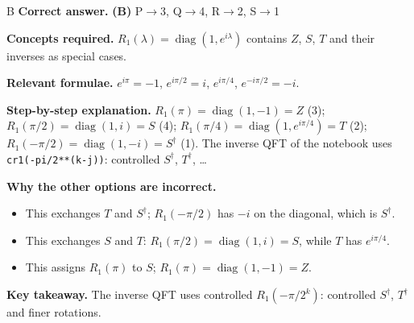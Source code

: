 \documentclass[11pt,a4paper]{article}
\newcommand{\qsep}{\par\vspace{2pt}{\color{black!15}\hrule}\vspace{4pt}}
\begin{document}
\begin{solbox}{B}
\textbf{\color{brand}Correct answer.} \textcolor{okgreen}{\textbf{(B)}} P$\to$3, Q$\to$4, R$\to$2, S$\to$1

\textbf{\color{brand}Concepts required.} $R_1(\lambda) = \operatorname{diag}(1, e^{i\lambda})$ contains $Z$, $S$, $T$ and their inverses as special cases.

\textbf{\color{brand}Relevant formulae.} $e^{i\pi} = -1$, $e^{i\pi/2} = i$, $e^{i\pi/4}$, $e^{-i\pi/2} = -i$.

\textbf{\color{brand}Step-by-step explanation.} $R_1(\pi) = \operatorname{diag}(1, -1) = Z$ (3); $R_1(\pi/2) = \operatorname{diag}(1, i) = S$ (4); $R_1(\pi/4) = \operatorname{diag}(1, e^{i\pi/4}) = T$ (2);
$R_1(-\pi/2) = \operatorname{diag}(1, -i) = S^\dagger$ (1). The inverse QFT of the notebook uses \texttt{cr1(-pi/2**(k-j))}: controlled $S^\dagger$, $T^\dagger$, \dots

\textbf{\color{brand}Why the other options are incorrect.}
\begin{itemize}[leftmargin=2.4em, itemsep=1pt, topsep=2pt]
\item[\textbf{(A)}] This exchanges $T$ and $S^\dagger$; $R_1(-\pi/2)$ has $-i$ on the diagonal, which is $S^\dagger$.
\item[\textbf{(C)}] This exchanges $S$ and $T$: $R_1(\pi/2) = \operatorname{diag}(1, i) = S$, while $T$ has $e^{i\pi/4}$.
\item[\textbf{(D)}] This assigns $R_1(\pi)$ to $S$; $R_1(\pi) = \operatorname{diag}(1, -1) = Z$.
\end{itemize}
\textbf{\color{brand}Key takeaway.} The inverse QFT uses controlled $R_1(-\pi/2^k)$: controlled $S^\dagger$, $T^\dagger$ and finer rotations.
\end{solbox}
\qsep
\end{document}

